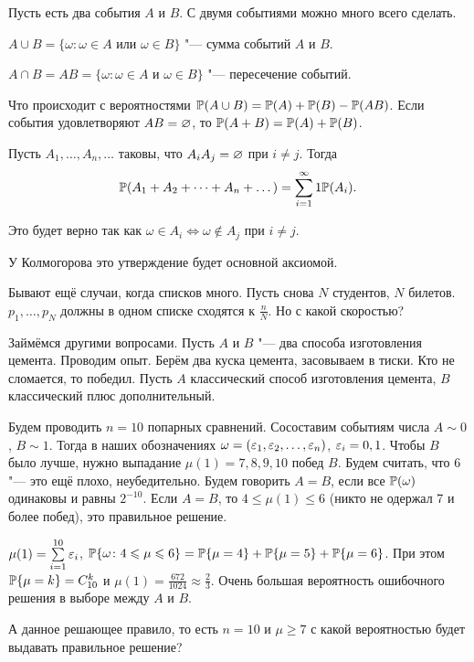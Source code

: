 Пусть есть два события $A$ и $B$. С двумя событиями можно много всего сделать.
\begin{Def}
 $A\cup B = \{\omega\colon \omega\in A\text{ или }\omega\in B\}$ "--- сумма событий $A$ и $B$.
\end{Def}

\begin{Def}
  $A\cap B = AB = \{\omega\colon \omega\in A\text{ и }\omega\in B\}$ "--- пересечение событий.
\end{Def}

Что происходит с вероятностями $\P(A\cup B) = \P(A) + \P(B) - \P(AB)$. Если события удовлетворяют $AB=\q$, то $\P(A+B) = \P(A) + \P(B)$.

\begin{Ut}
Пусть $A_1,\dots, A_n,\dots$ таковы, что $A_iA_j=\q$ при $i\ne j$. Тогда
\[
  \P(A_1 + A_2 + \dots + A_n +\dots) = \rY i1 \P(A_i).
\]
\end{Ut}
Это будет верно так как $\omega \in A_i\iff \omega \not\in A_j$ при $i\ne j$.

У Колмогорова это утверждение будет основной аксиомой.

Бывают ещё случаи, когда списков много. Пусть снова $N$ студентов, $N$ билетов. $p_1,\dots, p_N$ должны в одном списке сходятся к $\frac nN$. Но с какой скоростью?

Займёмся другими вопросами. Пусть $A$ и $B$ "--- два способа изготовления цемента. Проводим опыт.
Берём два куска цемента, засовываем в тиски. Кто не сломается, то победил. Пусть $A$ классический способ изготовления цемента, $B$ классический плюс дополнительный.

Будем проводить $n=10$ попарных сравнений. Сосоставим событиям числа $A\sim 0$, $B\sim 1$. Тогда в наших обозначениях $\omega = (\e_1,\e_2,\dots,\e_n)$, $\e_i = 0,1$. Чтобы $B$ было лучше, нужно выпадание $\mu(1)=7,8,9,10$ побед $B$. Будем считать, что $6$ "--- это ещё плохо, неубедительно. Будем говорить $A=B$, если все $\P(\omega)$ одинаковы и равны $2^{-10}$. Если $A=B$, то $4\le \mu(1) \le 6$ (никто не одержал 7 и более побед), это правильное решение.

$\mu(1) = \RY i1{10}\e_i$, $\P\{\omega\colon 4\le \mu\le 6\} = \P\{\mu=4\} + \P\{\mu = 5\} + \P\{\mu = 6\}$. При этом $\P\{\mu=k\} = C_{10}^k$ и $\mu(1) = \frac{672}{1024}\approx \frac23$.
Очень большая вероятность ошибочного решения в выборе между $A$ и $B$.

А данное решающее правило, то есть $n=10$ и $\mu\ge 7$ с какой вероятностью будет выдавать правильное решение?

